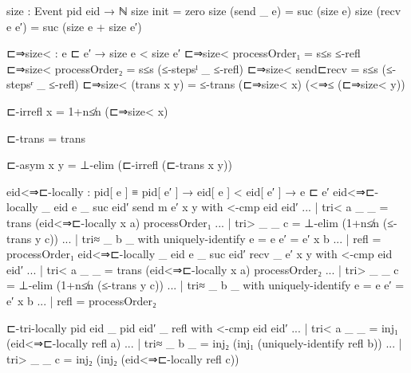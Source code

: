 \documentclass[acmsmall,review,anonymous]{acmart}
\theoremstyle{definition}
\theoremstyle{theorem}
\begin{document}


\appendix

\begin{code}
size : Event pid eid → ℕ
size init        = zero
size (send _ e)  = suc (size e)
size (recv e e′) = suc (size e + size e′)

⊏⇒size< : e ⊏ e′ → size e < size e′
⊏⇒size< processOrder₁ = s≤s ≤-refl
⊏⇒size< processOrder₂ = s≤s (≤-stepsˡ _ ≤-refl)
⊏⇒size< send⊏recv     = s≤s (≤-stepsʳ _ ≤-refl)
⊏⇒size< (trans x y)   = ≤-trans (⊏⇒size< x) (<⇒≤ (⊏⇒size< y))

⊏-irrefl x = 1+n≰n (⊏⇒size< x)

⊏-trans = trans

⊏-asym x y = ⊥-elim (⊏-irrefl (⊏-trans x y))

eid<⇒⊏-locally : pid[ e ] ≡ pid[ e′ ] → eid[ e ] < eid[ e′ ] → e ⊏ e′
eid<⇒⊏-locally {_} {eid} {e} {_} {suc eid′} {send m e′} x y with <-cmp eid eid′
... | tri< a _ _ = trans (eid<⇒⊏-locally x a) processOrder₁
... | tri> _ _ c = ⊥-elim (1+n≰n (≤-trans y c))
... | tri≈ _ b _ with uniquely-identify {e = e} {e′ = e′} x b
... | refl = processOrder₁
eid<⇒⊏-locally {_} {eid} {e} {_} {suc eid′} {recv _ e′} x y with <-cmp eid eid′
... | tri< a _ _ = trans (eid<⇒⊏-locally x a) processOrder₂
... | tri> _ _ c = ⊥-elim (1+n≰n (≤-trans y c))
... | tri≈ _ b _ with uniquely-identify {e = e} {e′ = e′} x b
... | refl = processOrder₂

⊏-tri-locally {pid} {eid} {_} {pid} {eid′} {_} refl with <-cmp eid eid′
... | tri< a _ _ = inj₁ (eid<⇒⊏-locally refl a)
... | tri≈ _ b _ = inj₂ (inj₁ (uniquely-identify refl b))
... | tri> _ _ c = inj₂ (inj₂ (eid<⇒⊏-locally refl c))
\end{code}
\end{document}
